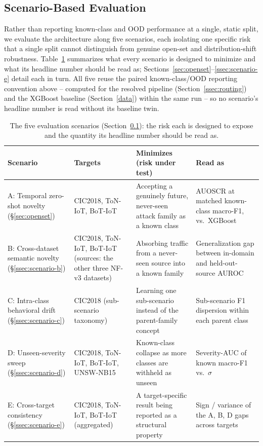 \documentclass[sigconf]{acmart}
\begin{document}
\subsection{Scenario-Based Evaluation} \label{ssec:scenarios}
Rather than reporting known-class and OOD performance at a single, static split, we evaluate the architecture along five scenarios, each isolating one specific risk that a single split cannot distinguish from genuine open-set and distribution-shift robustness. Table~\ref{tab:scenario-overview} summarizes what every scenario is designed to minimize and what its headline number should be read as; Sections~\ref{sec:openset}--\ref{ssec:scenario-e} detail each in turn. All five reuse the paired known-class/OOD reporting convention above -- computed for the resolved pipeline (Section~\ref{ssec:routing}) and the XGBoost baseline (Section~\ref{data}) within the same run -- so no scenario's headline number is read without its baseline twin.

\begin{table}[t]
\centering
\small
\caption{The five evaluation scenarios (Section~\ref{ssec:scenarios}): the risk each is designed to expose and the quantity its headline number should be read as.}
\label{tab:scenario-overview}
\begin{tabular}{@{}p{2.9cm}p{2.6cm}p{5.1cm}p{5.1cm}@{}}
\toprule
\textbf{Scenario} & \textbf{Targets} & \textbf{Minimizes (risk under test)} & \textbf{Read as} \\
\midrule
A: Temporal zero-shot novelty (\S\ref{sec:openset}) & CIC2018, ToN-IoT, BoT-IoT & Accepting a genuinely future, never-seen attack family as a known class & AUOSCR at matched known-class macro-F1, vs.\ XGBoost \\
B: Cross-dataset semantic novelty (\S\ref{ssec:scenario-b}) & CIC2018, ToN-IoT, BoT-IoT (sources: the other three NF-v3 datasets) & Absorbing traffic from a never-seen source into a known family & Generalization gap between in-domain and held-out-source AUROC \\
C: Intra-class behavioral drift (\S\ref{ssec:scenario-c}) & CIC2018 (sub-scenario taxonomy) & Learning one sub-scenario instead of the parent-family concept & Sub-scenario F1 dispersion within each parent class \\
D: Unseen-severity sweep (\S\ref{ssec:scenario-d}) & CIC2018, ToN-IoT, BoT-IoT, UNSW-NB15 & Known-class collapse as more classes are withheld as unseen & Severity-AUC of known macro-F1 vs.\ $\sigma$ \\
E: Cross-target consistency (\S\ref{ssec:scenario-e}) & CIC2018, ToN-IoT, BoT-IoT (aggregated) & A target-specific result being reported as a structural property & Sign / variance of the A, B, D gaps across targets \\
\bottomrule
\end{tabular}
\end{table}
\end{document}
